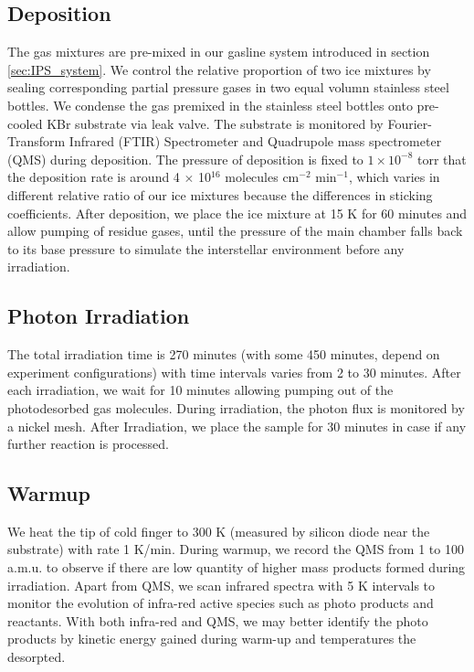 \subsection{Deposition}
The gas mixtures are pre-mixed in our gasline system introduced in section \ref{sec:IPS_system}. We control the relative proportion of two ice mixtures by sealing corresponding partial pressure gases in two equal volumn stainless steel bottles. We condense the gas premixed in the stainless steel bottles onto pre-cooled KBr substrate via leak valve. The substrate is monitored by Fourier-Transform Infrared (FTIR) Spectrometer and Quadrupole mass spectrometer (QMS) during deposition. The pressure of deposition is fixed to $1 \times 10^{-8}$ torr that the deposition rate is around 4 $\times$ 10$^{16}$ molecules cm$^{-2}$ min$^{-1}$, which varies in different relative ratio of our ice mixtures because the differences in sticking coefficients. After deposition, we place the ice mixture at 15 K for 60 minutes and allow pumping of residue gases, until the pressure of the main chamber falls back to its base pressure to simulate the interstellar environment before any irradiation.

\subsection{Photon Irradiation}
The total irradiation time is 270 minutes (with some 450 minutes, depend on experiment configurations) with time intervals varies from 2 to 30 minutes. After each irradiation, we wait for 10 minutes allowing pumping out of the photodesorbed gas molecules. During irradiation, the photon flux is monitored by a nickel mesh. After Irradiation, we place the sample for 30 minutes in case if any further reaction is processed.

\subsection{Warmup}
We heat the tip of cold finger to 300 K (measured by silicon diode near the substrate) with rate 1 K/min. During warmup, we record the QMS from 1 to 100 a.m.u. to observe if there are low quantity of higher mass products formed during irradiation. Apart from QMS, we scan infrared spectra with 5 K intervals to monitor the evolution of infra-red active species such as photo products and reactants. With both infra-red and QMS, we may better identify the photo products by kinetic energy gained during warm-up and temperatures the desorpted.

